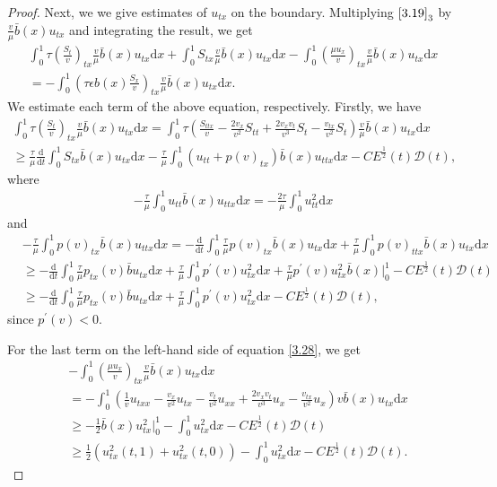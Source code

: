 \documentclass[10pt,a4paper]{amsart}
\newcommand{\dif}{\mathrm{d}}
\begin{document}
\begin{proof}
Next, we we give estimates of $u_{tx}$ on the boundary. Multiplying  $\eqref{3.19}_3$ by $\frac{v}{\mu} \bar b(x) u_{tx}$ and integrating the result, we get
\begin{align}
\int_0^1 \tau \left(\frac{S_t}{v}\right)_{tx} \frac{v}{\mu} \bar b(x) u_{tx} \dif x+\int_0^1 S_{tx}\frac{v}{\mu}\bar b(x) u_{tx} \dif x 
-\int_0^1 \left(\frac{\mu u_x}{v}\right)_{tx} \frac{v}{\mu} \bar b(x) u_{tx} \dif x \nonumber\\
=-\int_0^1\left( \tau\epsilon b(x) \frac{S_x}{v}\right)_{tx} \frac{v}{\mu} \bar b(x) u_{tx}\dif x . \label{3.29}
\end{align}
We estimate each term of the above equation, respectively. Firstly, we have
\begin{align*}
\int_0^1 \tau\left(\frac{S_t}{v}\right)_{tx} \frac{v}{\mu} \bar b(x) u_{tx} \dif x
=\int_0^1 \tau \left(\frac{S_{ttx}}{v}-\frac{2v_x}{v^2} S_{tt}+\frac{2v_xv_t}{v^3} S_t-\frac{v_{tx}}{v^2} S_t\right)\frac{v}{\mu} \bar b(x) u_{tx}\dif x\\
\ge \frac{\tau}{\mu} \frac{\dif}{\dif t}\int_0^1 S_{tx} \bar b(x) u_{tx}\dif x -\frac{\tau}{\mu}\int_0^1 (u_{tt}+p(v)_{tx}) \bar b(x) u_{ttx}\dif x -C E^\frac{1}{2}(t) \mathcal D(t),
\end{align*}
where
\begin{align*}
-\frac{\tau}{\mu} \int_0^1 u_{tt} \bar b(x) u_{ttx}\dif x=-\frac{2\tau}{\mu}\int_0^1  u_{tt}^2\dif x
\end{align*}
and
\begin{align*}
&-\frac{\tau}{\mu} \int_0^1 p(v)_{tx} \bar b(x) u_{ttx}\dif x=-\frac{\dif}{\dif t} \int_0^1 \frac{\tau}{\mu}  p(v)_{tx}\bar b(x) u_{tx} \dif x+\frac{\tau}{\mu}\int_0^1 p(v)_{ttx} \bar b(x)u_{tx}\dif x\\
&\ge-\frac{\dif}{\dif t}\int_0^1 \frac{\tau}{\mu} p_{tx}(v) \bar b u_{tx}\dif x +\frac{\tau}{\mu} \int_0^1 p^\prime(v)u_{tx}^2\dif x +\frac{\tau}{\mu} p^\prime(v) u_{tx}^2 \bar b(x)\big|_0^1-CE^\frac{1}{2}(t)\mathcal D(t)\\
 &\ge-\frac{\dif}{\dif t}\int_0^1 \frac{\tau}{\mu} p_{tx}(v) \bar b u_{tx}\dif x +\frac{\tau}{\mu} \int_0^1 p^\prime(v)u_{tx}^2\dif x-CE^\frac{1}{2}(t)\mathcal D(t),
\end{align*} 
since $p^\prime(v)<0$. 

For the last term on the left-hand side of equation \eqref{3.28}, we get
\begin{align*}
&-\int_0^1 \left(\frac{\mu u_x}{v}\right)_{tx} \frac{v}{\mu} \bar b(x) u_{tx}\dif x\\
&=-\int_0^1\left(\frac{1}{v} u_{txx}-\frac{v_x}{v^2} u_{tx}-\frac{v_t}{v^2}u_{xx}+\frac{2v_x v_t}{v^3} u_x-\frac{v_{tx}}{v^2}u_x\right)v \bar b(x)u_{tx}\dif x\\
&\ge -\frac{1}{2}\bar b(x) u_{tx}^2 \big|_0^1-\int_0^1 u_{tx}^2\dif x-CE^\frac{1}{2}(t)\mathcal D(t)\\
&\ge \frac{1}{2} (u_{tx}^2(t,1)+u_{tx}^2(t, 0))-\int_0^1 u_{tx}^2 \dif x-CE^\frac{1}{2}(t)\mathcal D(t).
\end{align*}




\end{proof}
\end{document}
